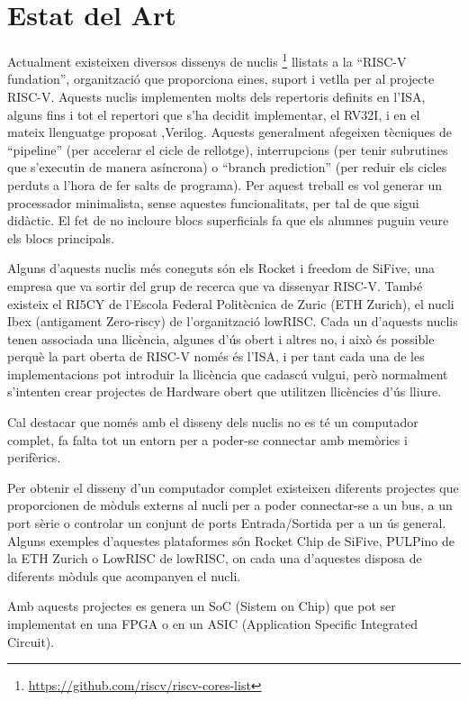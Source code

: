 \documentclass[10pt,a4paper,twocolumn,twoside]{article}
\begin{document}
\section{Estat del Art}
\label{sec:Art}
Actualment existeixen diversos dissenys de nuclis \footnote{\href{https://github.com/riscv/riscv-cores-list}{https://github.com/riscv/riscv-cores-list}} llistats a la ``RISC-V fundation'', organització que proporciona eines, suport i vetlla per al projecte RISC-V. Aquests nuclis implementen molts dels repertoris definits en l'ISA, alguns fins i tot el repertori que s'ha decidit implementar, el RV32I, i en el mateix llenguatge proposat ,Verilog. Aquests generalment afegeixen tècniques de ``pipeline'' (per accelerar el cicle de rellotge), interrupcions (per tenir subrutines que s'executin de manera asíncrona) o ``branch prediction'' (per reduir els cicles perduts a l'hora de fer salts de programa). 
Per aquest treball es vol generar un processador minimalista, sense aquestes funcionalitats, per tal de que sigui didàctic. 
El fet de no incloure blocs superficials fa que els alumnes puguin veure els blocs principals. 

Alguns d'aquests nuclis més coneguts són els Rocket i freedom de SiFive, una empresa que va sortir del grup de recerca que va dissenyar RISC-V. També existeix el RI5CY de l'Escola Federal Politècnica de Zuric (ETH Zurich), el nucli Ibex (antigament Zero-riscy) de l'organització lowRISC.
Cada un d'aquests nuclis tenen associada una llicència, algunes d'ús obert i altres no, i això és possible perquè la part oberta de RISC-V només és l'ISA, i per tant cada una de les implementacions pot introduir la llicència que cadascú vulgui, però normalment s'intenten crear projectes de Hardware obert que utilitzen llicències d'ús lliure.

Cal destacar que només amb el disseny dels nuclis no es té un computador complet, fa falta tot un entorn per a poder-se connectar amb memòries i perifèrics. 

Per obtenir el disseny d'un computador complet existeixen diferents projectes que proporcionen de mòduls externs al nucli per a poder connectar-se a un bus, a un port sèrie o controlar un conjunt de ports Entrada/Sortida per a un ús general. Alguns exemples d'aquestes plataformes són Rocket Chip de SiFive, PULPino de la ETH Zurich o LowRISC de lowRISC, on cada una d'aquestes disposa de diferents mòduls que acompanyen el nucli.

Amb aquests projectes es genera un SoC (Sistem on Chip) que pot ser implementat en una FPGA o en un ASIC (Application Specific Integrated Circuit).
\end{document}
